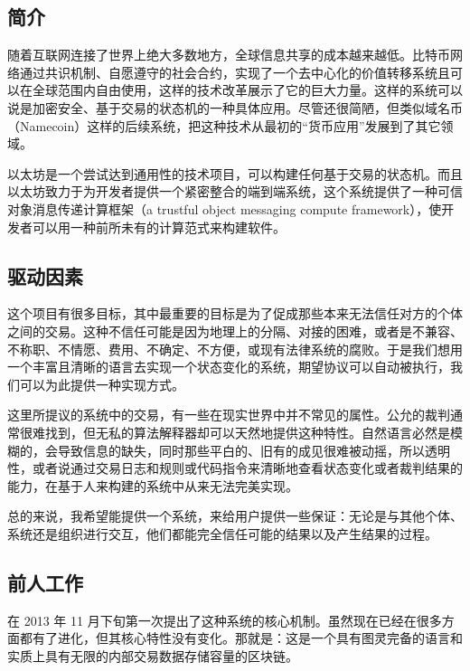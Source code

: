 \documentclass[9pt,oneside]{amsart}
\begin{document}
\setlength{\columnsep}{20pt}
\begin{multicols}{2}

\section{简介}\label{sec:introduction}


随着互联网连接了世界上绝大多数地方，全球信息共享的成本越来越低。比特币网络通过共识机制、自愿遵守的社会合约，实现了一个去中心化的价值转移系统且可以在全球范围内自由使用，这样的技术改革展示了它的巨大力量。这样的系统可以说是加密安全、基于交易的状态机的一种具体应用。尽管还很简陋，但类似域名币（Namecoin）这样的后续系统，把这种技术从最初的“货币应用”发展到了其它领域。

以太坊是一个尝试达到通用性的技术项目，可以构建任何基于交易的状态机。而且以太坊致力于为开发者提供一个紧密整合的端到端系统，这个系统提供了一种可信对象消息传递计算框架（a trustful object messaging compute framework），使开发者可以用一种前所未有的计算范式来构建软件。

\subsection{驱动因素} \label{ch:driving}

这个项目有很多目标，其中最重要的目标是为了促成那些本来无法信任对方的个体之间的交易。这种不信任可能是因为地理上的分隔、对接的困难，或者是不兼容、不称职、不情愿、费用、不确定、不方便，或现有法律系统的腐败。于是我们想用一个丰富且清晰的语言去实现一个状态变化的系统，期望协议可以自动被执行，我们可以为此提供一种实现方式。


这里所提议的系统中的交易，有一些在现实世界中并不常见的属性。公允的裁判通常很难找到，但无私的算法解释器却可以天然地提供这种特性。自然语言必然是模糊的，会导致信息的缺失，同时那些平白的、旧有的成见很难被动摇，所以透明性，或者说通过交易日志和规则或代码指令来清晰地查看状态变化或者裁判结果的能力，在基于人来构建的系统中从来无法完美实现。

总的来说，我希望能提供一个系统，来给用户提供一些保证：无论是与其他个体、系统还是组织进行交互，他们都能完全信任可能的结果以及产生结果的过程。


\subsection{前人工作} \label{ch:previous}

\cite{buterin2013ethereum} 在 2013 年 11 月下旬第一次提出了这种系统的核心机制。虽然现在已经在很多方面都有了进化，但其核心特性没有变化。那就是：这是一个具有图灵完备的语言和实质上具有无限的内部交易数据存储容量的区块链。


\end{multicols}
\end{document}
